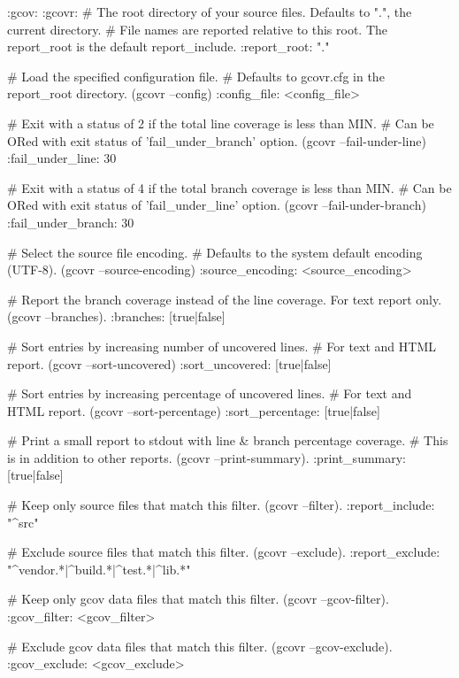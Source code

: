 \begin{DoxyCode}
:gcov:
  :gcovr:
    # The root directory of your source files. Defaults to ".", the current directory.
    # File names are reported relative to this root. The report\_root is the default report\_include.
    :report\_root: "."

    # Load the specified configuration file.
    # Defaults to gcovr.cfg in the report\_root directory. (gcovr --config)
    :config\_file: <config\_file>

    # Exit with a status of 2 if the total line coverage is less than MIN.
    # Can be ORed with exit status of 'fail\_under\_branch' option. (gcovr --fail-under-line)
    :fail\_under\_line: 30

    # Exit with a status of 4 if the total branch coverage is less than MIN.
    # Can be ORed with exit status of 'fail\_under\_line' option. (gcovr --fail-under-branch)
    :fail\_under\_branch: 30

    # Select the source file encoding.
    # Defaults to the system default encoding (UTF-8). (gcovr --source-encoding)
    :source\_encoding: <source\_encoding>

    # Report the branch coverage instead of the line coverage. For text report only. (gcovr --branches).
    :branches: [true|false]

    # Sort entries by increasing number of uncovered lines.
    # For text and HTML report. (gcovr --sort-uncovered)
    :sort\_uncovered: [true|false]

    # Sort entries by increasing percentage of uncovered lines.
    # For text and HTML report. (gcovr --sort-percentage)
    :sort\_percentage: [true|false]

    # Print a small report to stdout with line & branch percentage coverage.
    # This is in addition to other reports. (gcovr --print-summary).
    :print\_summary: [true|false]

    # Keep only source files that match this filter. (gcovr --filter).
    :report\_include: "^src"

    # Exclude source files that match this filter. (gcovr --exclude).
    :report\_exclude: "^vendor.*|^build.*|^test.*|^lib.*"

    # Keep only gcov data files that match this filter. (gcovr --gcov-filter).
    :gcov\_filter: <gcov\_filter>

    # Exclude gcov data files that match this filter. (gcovr --gcov-exclude).
    :gcov\_exclude: <gcov\_exclude>


\end{DoxyCode}
